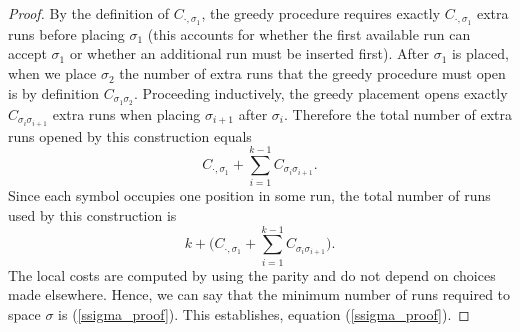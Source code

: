 \documentclass[a4paper,12pt]{article}
\theoremstyle{definition}
\numberwithin{equation}{section}
\begin{document}
\begin{proof}
By the definition of $C_{\cdot,\sigma_1}$, the greedy procedure requires exactly $C_{\cdot,\sigma_1}$ extra runs before placing $\sigma_1$ (this accounts for whether the first available run can accept $\sigma_1$ or whether an additional run must be inserted first).  After $\sigma_1$ is placed, when we place $\sigma_2$ the number of extra runs that the greedy procedure must open is by definition $C_{\sigma_1\sigma_2}$.  Proceeding inductively, the greedy placement opens exactly $C_{\sigma_i\sigma_{i+1}}$ extra runs when placing $\sigma_{i+1}$ after $\sigma_i$.  Therefore the total number of extra runs opened by this construction equals
\[
C_{\cdot,\sigma_1}+\sum_{i=1}^{k-1} C_{\sigma_i\sigma_{i+1}}.
\]
Since each symbol occupies one position in some run, the total number of runs used by this construction is
\begin{equation}\label{ssigma_proof}
k + \biggl(C_{\cdot,\sigma_1}+\sum_{i=1}^{k-1} C_{\sigma_i\sigma_{i+1}}\biggr).
\end{equation}
The local costs are computed by using the parity and do not depend on choices made elsewhere. Hence, we can say that the minimum number of runs required to space $\sigma$ is (\ref{ssigma_proof}). This establishes, 
equation (\ref{ssigma_proof}).

\end{proof}
\end{document}
